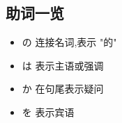     \subsection{助词一览}
    \begin{itemize}
        \item の 连接名词,表示 "的"
        \item は 表示主语或强调
        \item か 在句尾表示疑问
        \item を 表示宾语
    \end{itemize}

